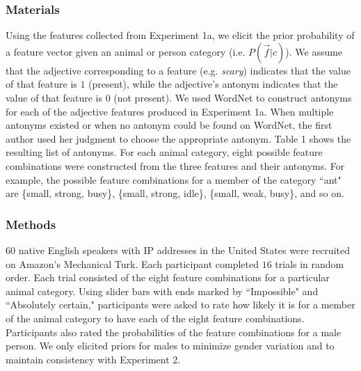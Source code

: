 \documentclass[10pt,letterpaper]{article}
\begin{document}
\subsubsection{Materials}
Using the features collected from Experiment 1a, we elicit the prior probability of a feature vector given an animal or person category (i.e. $P(\vec f | c)$). We assume that the adjective corresponding to a feature (e.g. \emph{scary}) indicates that the value of that feature is $1$ (present), while the adjective's antonym indicates that the value of that feature is $0$ (not present). We used WordNet to construct antonyms for each of the adjective features produced in Experiment 1a. When multiple antonyms existed or when no antonym could be found on WordNet, the first author used her judgment to choose the appropriate antonym. Table 1 shows the resulting list of antonyms. For each animal category, eight possible feature combinations were constructed from the three features and their antonyms. For example, the possible feature combinations for a member of the category ``ant" are \{small, strong, busy\}, \{small, strong, idle\}, \{small, weak, busy\}, and so on.

\subsubsection{Methods}
$60$ native English speakers with IP addresses in the United States were recruited on Amazon's Mechanical Turk. Each participant completed $16$ trials in random order. Each trial consisted of the eight feature combinations for a particular animal category. Using slider bars with ends marked by ``Impossible" and ``Absolutely certain," participants were asked to rate how likely it is for a member of the animal category to have each of the eight feature combinations. Participants also rated the probabilities of the feature combinations for a male person. We only elicited priors for males to minimize gender variation and to maintain consistency with Experiment 2.
\end{document}
